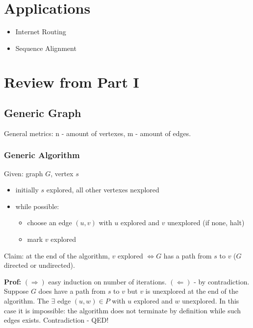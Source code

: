 \documentclass{scrartcl}
\begin{document}
\tableofcontents
\section {Applications}
\label{sec:Section1}
\begin{itemize}
\item Internet Routing
\item Sequence Alignment
\end{itemize}

\section{Review from Part I}
\label{sec:Section2}
\subsection{Generic Graph}
\label{Graphs}
General metrics: n - amount of vertexes, m - amount of edges.

\subsubsection{Generic Algorithm}
\label{sec:Genericlgorithm} 
Given: graph $G$, vertex $s$
\begin{itemize}
\item initially $s$ explored, all other vertexes nexplored
\item while possible:
  \begin{itemize}
  \item choose an edge $(u, v)$ with $u$ explored and $v$ unexplored (if none,
    halt)
  \item mark $v$ explored
  \end{itemize}
\end{itemize}

Claim: at the end of the algorithm, $v$ explored $\Leftrightarrow G$ has a path
from $s$ to $v$ ($G$ directed or undirected).

{\bf Prof:} $(\Rightarrow)$ easy induction on number of iterations.
$(\Leftarrow)$ - by contradiction. Suppose $G$ does have a path from $s$ to $v$
but $v$ is unexplored at the end of the algorithm. The $\exists$ edge $(u, w)
\in P$ with $u$ explored and $w$ unexplored. In this case it is impossible: the
algorithm does not terminate by definition while such edges exists.
Contradiction - QED!
\end{document}
